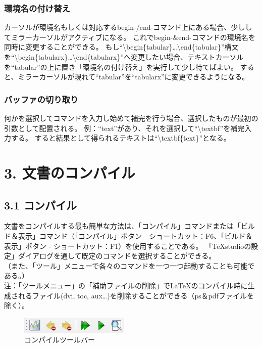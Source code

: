 \documentclass[]{book}
\makeatletter
\def\maxwidth{\ifdim\Gin@nat@width>\linewidth\linewidth
\else\Gin@nat@width\fi}
\let\Oldincludegraphics\includegraphics
\renewcommand{\includegraphics}[1]{\Oldincludegraphics[width=\maxwidth]{#1}}
\makeatother
\begin{document}
\subsection{環境名の付け替え}

カーソルが環境名もしくは対応するbegin-/end-コマンド上にある場合、少ししてミラーカーソルがアクティブになる。
これでbegin-\&end-コマンドの環境名を同時に変更することができる。
もし``\textbackslash{}begin\{tabular\}\ldots{}\textbackslash{}end\{tabular\}''構文を``\textbackslash{}begin\{tabularx\}\ldots{}\textbackslash{}end\{tabularx\}''へ変更したい場合、テキストカーソルを``tabular''の上に置き「環境名の付け替え」を実行して少し待てばよい。
すると、ミラーカーソルが現れて``tabular''を``tabularx''に変更できるようになる。

\subsection{バッファの切り取り}

何かを選択してコマンドを入力し始めて補完を行う場合、選択したものが最初の引数として配置される。
例：``text''があり、それを選択して``\textbackslash{}textbf''を補完入力する。
すると結果として得られるテキストは``\textbackslash{}textbf\{text\}''となる。

\chapter{3. 文書のコンパイル}

\section{3.1 コンパイル}

文書をコンパイルする最も簡単な方法は、「コンパイル」コマンドまたは「ビルド＆表示」コマンド（「コンパイル」ボタン
- ショートカット：F6、「ビルド＆表示」ボタン -
ショートカット：F1）を使用することである。
「TeXstudioの設定」ダイアログを通して既定のコマンドを選択することができる。\\
（また、「ツール」メニューで各々のコマンドを一つ一つ起動することも可能である。）\\
注：「ツールメニュー」の「補助ファイルの削除」でLaTeXのコンパイル時に生成されるファイル(dvi,
toc, aux\ldots{})を削除することができる（ps＆pdfファイルを除く）。\\

\begin{figure}[htbp]
\centering
\includegraphics{compile_toolbar.png}
\caption{コンパイルツールバー}
\end{figure}
\end{document}
